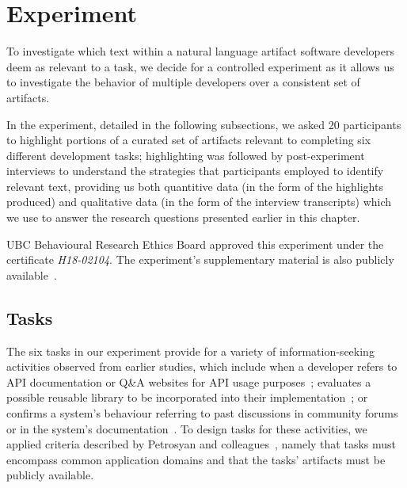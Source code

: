 
\section{Experiment}
\label{cp3:experiment}



To investigate which text within a natural language artifact software developers deem as relevant to a task,
 we decide for a controlled experiment
 as it allows us to investigate the behavior of multiple developers
over a consistent set of artifacts.



In the experiment, detailed in the following subsections,
we asked 20 participants to highlight portions of a curated
set of artifacts relevant to completing six different development tasks;
 highlighting was followed by post-experiment 
interviews to understand the
strategies that participants employed to identify relevant text,
providing us both 
quantitive data (in the form of the highlights produced) 
and qualitative data (in the form of the interview transcripts) 
which we use to answer the research questions 
presented earlier in this chapter.






\acs{UBC} Behavioural Research Ethics Board  approved this experiment under the certificate \textit{H18-02104}.
The experiment's supplementary material is also publicly available~\cite{cp3_supplementary_material}.




\subsection{Tasks}
\label{cp3:method-tasks}


The six tasks in our experiment provide for a variety of information-seeking activities observed from earlier
studies, which include when a developer
refers to API documentation or Q\&A websites for API usage purposes~\cite{umarji2008archetypal, Singer1998,robillard2011field};
evaluates a possible reusable library to be incorporated into their implementation~\cite{umarji2008archetypal}; or
confirms a system's behaviour referring to past discussions in community forums or in the system's documentation~\cite{umarji2008archetypal, Lotufo2012, Singer1998}.
To design tasks for these activities, we applied criteria described by Petrosyan and colleagues~\cite{Petrosyan2015}, namely that
tasks must encompass common application domains and that the tasks' artifacts must be publicly available.


